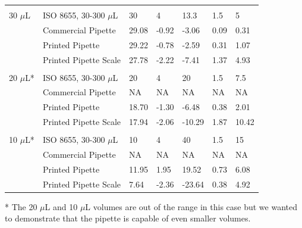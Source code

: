 \documentclass[10pt,letterpaper]{article}
\begin{document}
\begin{table}[!ht]
\begin{adjustwidth}{-2.25in}{0in}
\begin{tabular}{lllllll}
			&                       &        &                  &              &              &               \\
			30 $\mu$L  & ISO 8655, 30-300 $\mu$L   & 30     & 4                & 13.3         & 1.5          & 5             \\
			& Commercial Pipette    & 29.08  & -0.92            & -3.06        & 0.09         & 0.31          \\
			& Printed Pipette       & 29.22  & -0.78            & -2.59        & 0.31         & 1.07          \\
			& Printed Pipette Scale & 27.78  & -2.22            & -7.41        & 1.37         & 4.93          \\
			&                       &        &                  &              &              &               \\
			20 $\mu$L* & ISO 8655, 30-300 $\mu$L   & 20     & 4                & 20           & 1.5          & 7.5           \\
			& Commercial Pipette    & NA     & NA               & NA           & NA           & NA            \\
			& Printed Pipette       & 18.70  & -1.30            & -6.48        & 0.38         & 2.01          \\
			& Printed Pipette Scale & 17.94  & -2.06            & -10.29       & 1.87         & 10.42         \\
			&                       &        &                  &              &              &               \\
			10 $\mu$L* & ISO 8655, 30-300 $\mu$L   & 10     & 4                & 40           & 1.5          & 15            \\
			& Commercial Pipette    & NA     & NA               & NA           & NA           & NA            \\
			& Printed Pipette       & 11.95  & 1.95             & 19.52        & 0.73         & 6.08          \\
			& Printed Pipette Scale & 7.64   & -2.36            & -23.64       & 0.38         & 4.92         
		\end{tabular}
		\begin{flushleft} * The 20 $\mu$L and 10 $\mu$L volumes are out of the range in this case but we wanted to demonstrate that the pipette is capable of even smaller volumes.
		\end{flushleft}
	\end{adjustwidth}
\end{table}
\end{document}
